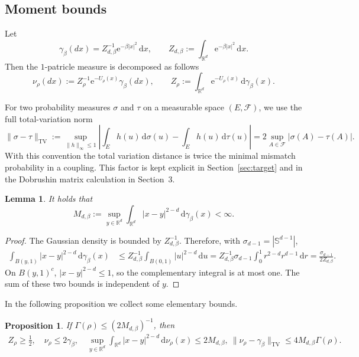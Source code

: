 \documentclass[12pt,reqno,letterpaper]{amsart}
\newtheorem{proposition}[theorem]{Proposition}
\newtheorem{lemma}[theorem]{Lemma}
\theoremstyle{definition}
\theoremstyle{remark}
\numberwithin{equation}{section}
\newcommand{\R}{\mathbb R}
\newcommand{\dd}{\,\mathrm d}
\newcommand{\ee}{\mathrm e}
\newcommand{\be}{\beta}
\newcommand{\TV}{\mathrm{TV}}
\begin{document}
\subsection{Moment bounds}
Let
\begin{equation*}
 \gamma_\be(dx)=Z_{d,\be}^{-1}\ee^{-\be|x|^2}\dd x, \qquad Z_{d,\be}:=\int_{\R^d}\ee^{-\be|x|^2}\dd x. 
\end{equation*}
Then the $1$-patricle measure is decomposed as follows 
\begin{equation*}
 \nu_{\rho}(dx)
 := Z_{\rho}^{-1}\ee^{-U_{\rho}(x)}\gamma_\be(dx),
 \qquad
 Z_{\rho} := \int_{\R^d}\ee^{-U_{\rho}(x)}\dd\gamma_\be(x).
\end{equation*}

For two probability measures \(\sigma\) and \(\tau\) on a measurable space
\((E,\mathcal F)\), we use the full total-variation norm
\begin{equation}\label{eq:TV-convention}
 \|\sigma-\tau\|_{\TV}
 :=\sup_{\|h\|_\infty\le1}
 \left|\int_Eh(u)\dd\sigma(u)-\int_Eh(u)\dd\tau(u)\right|
 =2\sup_{A\in\mathcal F}|\sigma(A)-\tau(A)|.
\end{equation}
With this convention the total variation distance is twice the minimal
mismatch probability in a coupling.  This factor is kept explicit in
Section~\ref{sec:target} and in the Dobrushin matrix calculation in
Section~3.

\begin{lemma}\label{lem:gaussian-moment}
It holds that \begin{equation*} 
 M_{d,\be}:=
 \sup_{y\in\R^d}\int_{\R^d}|x-y|^{2-d}\dd\gamma_\be(x)<\infty.
\end{equation*}
\end{lemma}

\begin{proof}
The Gaussian density is bounded by \(Z_{d,\be}^{-1}\).  Therefore, with
\(\sigma_{d-1}=|\mathbb S^{d-1}|\),
\begin{align*}
 \int_{B(y,1)}|x-y|^{2-d}\dd\gamma_\be(x)
 &\le Z_{d,\be}^{-1}
   \int_{B(0,1)}|u|^{2-d}\dd u=Z_{d,\be}^{-1}\sigma_{d-1}\int_0^1r^{2-d}r^{d-1}\dd r
 =\frac{\sigma_{d-1}}{2Z_{d,\be}}.
\end{align*}
On \(B(y,1)^c\), \(|x-y|^{2-d}\le1\), so the complementary integral is at
most one.  The sum of these two bounds is independent of \(y\).
\end{proof}
In the following proposition we collect some elementary bounds. 

\begin{proposition}
\label{prop:basic-onesite}
If \(\Gamma(\rho)\le(2M_{d,\be})^{-1}\), then
\[
 \begin{gathered}
 Z_{\rho}\ge\tfrac12,\quad
 \nu_{\rho}\le2\gamma_\be,\quad
 \sup_{y\in\R^d}\int_{\R^d}|x-y|^{2-d}\dd\nu_{\rho}(x)
 \le2M_{d,\be}, \ \|\nu_{\rho}-\gamma_\be\|_{\TV}
 \le4M_{d,\be}\Gamma(\rho).
 \end{gathered}
\]
\end{proposition}
\end{document}
